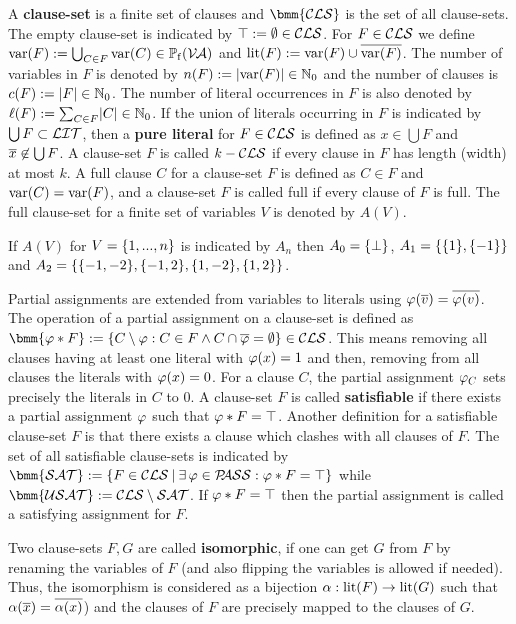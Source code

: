 \documentclass{report}
\begin{document}
A \textbf{clause-set} is a finite set of clauses and $\bmm{\Cls}$ is the set of all clause-sets. The empty clause-set is indicated by $\top := \emptyset \in \mathcal{CLS}$. For $F \in \mathcal{CLS}$ we define $\operatorname{var}(F) := \bigcup_{C \in F} \operatorname{var}(C) \in \operatorname{\mathbb{P}_f}(\mathcal{V\hspace{-0.1em}A})$ and $\operatorname{lit}(F) := \operatorname{var}(F) \cup \overline{\operatorname{var}(F)}$. The number of variables in $F$ is denoted by $n(F) := \lvert \operatorname{var}(F) \rvert \in \mathbb{N}_0$ and the number of clauses is $c(F) := \lvert F \rvert \in \mathbb{N}_0$. The number of literal occurrences in $F$ is also denoted by $\ell(F) := \sum_{C \in F} \lvert C \rvert \in \mathbb{N}_0$. If the union of literals occurring in $F$ is indicated by $\bigcup F \subset \mathcal{LIT}$, then a \textbf{pure literal} for $F \in \mathcal{CLS}$ is defined as $x \in \bigcup F$ and $\overline{x} \not \in \bigcup F$. A clause-set $F$ is called $k-\mathcal{CLS}$ if every clause in $F$ has length (width) at most $k$. A full clause $C$  for a clause-set $F$ is defined as $C \in F$ and $\operatorname{var}(C) = \operatorname{var}(F)$, and a clause-set $F$ is called full if every clause of $F$ is full. The full clause-set for a finite set of variables $V$ is denoted by $A(V)$. 

\begin{examp}\label{exp:An}
If $A(V)$ for $V=\{ 1,..., n \}$ is indicated by $A_n$ then $A_0 = \{ \bot \}$, $A_1 = \{ \{ 1 \},\{ -1 \} \}$ and $A_2 = \{ \{ -1,-2 \},\{ -1,2 \},\{ 1,-2 \},\{ 1,2 \} \}$.
\end{examp}

Partial assignments are extended from variables to literals using $\varphi(\overline{v})=\overline{\varphi(v)}$. The operation of a partial assignment on a clause-set is defined as $\bmm{\vp * F} := \set{C \sm \vp : C \in F \wedge C \cap \ol{\vp} = \es} \in \Cls$. This means removing all clauses having at least one literal with $\varphi (x)=1$ and then, removing from all clauses the literals with $\varphi (x)=0$. For a clause $C$, the partial assignment $\varphi_C$ sets precisely the literals in $C$ to 0. A clause-set $F$ is called \textbf{satisfiable} if there exists a partial assignment $\varphi$ such that $\varphi * F = \top$. Another definition for a satisfiable clause-set $F$ is that there exists a clause which clashes with all clauses of $F$. The set of all satisfiable clause-sets is indicated by $\bmm{\Sat} := \set{F \in \Cls \mb \ex\, \vp \in \Pass : \vp * F = \top}$ while $\bmm{\Usat} := \Cls \sm \Sat$. If $\varphi * F = \top$ then the partial assignment is called a satisfying assignment for $F$.

Two clause-sets $F, G$ are called \textbf{isomorphic}, if one can get $G$ from $F$ by renaming the variables of $F$ (and also flipping the variables is allowed if needed). Thus, the isomorphism is considered as a bijection $\alpha: \operatorname{lit}(F) \rightarrow \operatorname{lit}(G)$ such that $\alpha(\overline{x}) = \overline{\alpha(x)}$) and the clauses of $F$ are precisely mapped to the clauses of $G$. 
\end{document}
